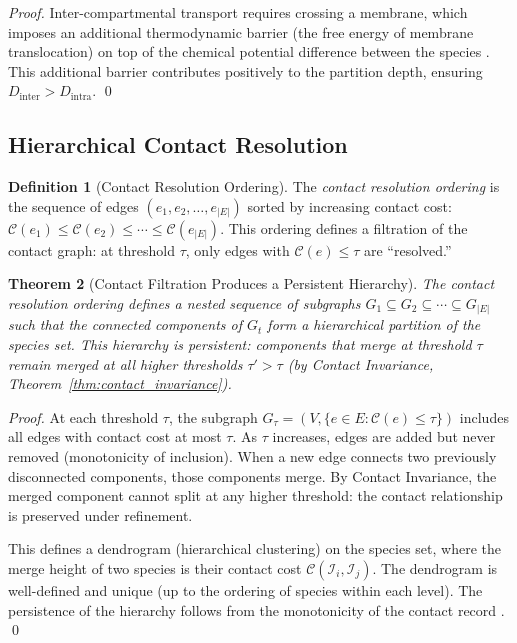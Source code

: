 \documentclass[11pt,twocolumn]{article}
\theoremstyle{plain}
\newtheorem{theorem}{Theorem}[section]
\theoremstyle{definition}
\newtheorem{definition}[theorem]{Definition}
\newcommand{\CC}{\mathcal{C}}
\begin{document}
\begin{proof}
Inter-compartmental transport requires crossing a membrane, which imposes an
additional thermodynamic barrier (the free energy of membrane translocation)
on top of the chemical potential difference between the species
\cite{diekmann2013evolution, zecchin2015metabolic}. This additional barrier
contributes positively to the partition depth, ensuring
$D_{\text{inter}} > D_{\text{intra}}$. \qed
\end{proof}

\subsection{Hierarchical Contact Resolution}

\begin{definition}[Contact Resolution Ordering]
\label{def:resolution_ordering}
The \emph{contact resolution ordering} is the sequence of edges
$(e_1, e_2, \ldots, e_{|E|})$ sorted by increasing contact cost:
$\CC(e_1) \leq \CC(e_2) \leq \cdots \leq \CC(e_{|E|})$. This ordering
defines a filtration of the contact graph: at threshold $\tau$, only edges
with $\CC(e) \leq \tau$ are ``resolved.''
\end{definition}

\begin{theorem}[Contact Filtration Produces a Persistent Hierarchy]
\label{thm:filtration}
The contact resolution ordering defines a nested sequence of subgraphs
$G_1 \subseteq G_2 \subseteq \cdots \subseteq G_{|E|}$ such that the
connected components of $G_t$ form a hierarchical partition of the species set.
This hierarchy is persistent: components that merge at threshold $\tau$ remain
merged at all higher thresholds $\tau' > \tau$ (by Contact Invariance,
Theorem~\ref{thm:contact_invariance}).
\end{theorem}

\begin{proof}
At each threshold $\tau$, the subgraph $G_\tau = (V, \{e \in E : \CC(e) \leq
\tau\})$ includes all edges with contact cost at most $\tau$. As $\tau$
increases, edges are added but never removed (monotonicity of inclusion).
When a new edge connects two previously disconnected components, those
components merge. By Contact Invariance, the merged component cannot split at
any higher threshold: the contact relationship is preserved under refinement.

This defines a dendrogram (hierarchical clustering) on the species set, where
the merge height of two species is their contact cost $\CC(\mathcal{I}_i,
\mathcal{I}_j)$. The dendrogram is well-defined and unique (up to the ordering
of species within each level). The persistence of the hierarchy follows from
the monotonicity of the contact record \cite{edelsbrunner2008persistent,
ghrist2008barcodes, carlsson2009topology}. \qed
\end{proof}
\end{document}

